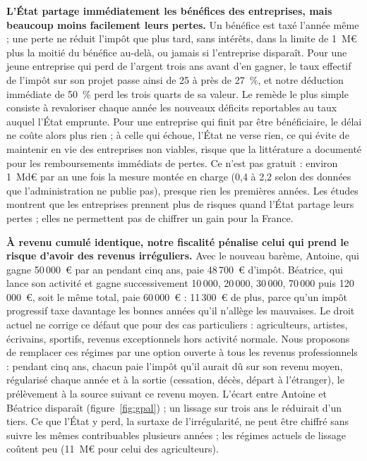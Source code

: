 \textbf{L'État partage immédiatement les bénéfices des entreprises, mais beaucoup moins facilement leurs pertes.} Un
bénéfice est taxé l'année même ; une perte ne réduit l'impôt que plus tard, sans intérêts, dans la limite de 1~M€ plus
la moitié du bénéfice au-delà, ou jamais si l'entreprise disparaît. Pour une jeune entreprise qui perd de l'argent trois
ans avant d'en gagner, le taux effectif de l'impôt sur son projet passe ainsi de 25 à près de 27~\%, et notre déduction
immédiate de 50~\% perd les trois quarts de sa valeur. Le remède le plus simple consiste à revaloriser chaque année les
nouveaux déficits reportables au taux auquel l'État emprunte. Pour une entreprise qui finit par être bénéficiaire, le
délai ne coûte alors plus rien ; à celle qui échoue, l'État ne verse rien, ce qui évite de maintenir en vie des
entreprises non viables, risque que la littérature a documenté pour les remboursements immédiats de pertes. Ce n'est
pas gratuit : environ 1~Md€ par an une fois la mesure montée en charge (0,4 à 2,2 selon des données que
l'administration ne publie pas), presque rien les premières années. Les études montrent que les entreprises prennent
plus de risques quand l'État partage leurs pertes ; elles ne permettent pas de chiffrer un gain pour la France.

\textbf{À revenu cumulé identique, notre fiscalité pénalise celui qui prend le risque d'avoir des revenus irréguliers.}
Avec le nouveau barème, Antoine, qui gagne 50\,000~€ par an pendant cinq ans, paie 48\,700~€ d'impôt. Béatrice, qui
lance son activité et gagne successivement 10\,000, 20\,000, 30\,000, 70\,000 puis 120\,000~€, soit le même total, paie
60\,000~€ : 11\,300~€ de plus, parce qu'un impôt progressif taxe davantage les bonnes années qu'il n'allège les
mauvaises. Le droit actuel ne corrige ce défaut que pour des cas particuliers : agriculteurs, artistes, écrivains,
sportifs, revenus exceptionnels hors activité normale. Nous proposons de remplacer ces régimes par une option ouverte à
tous les revenus professionnels : pendant cinq ans, chacun paie l'impôt qu'il aurait dû sur son revenu moyen,
régularisé chaque année et à la sortie (cessation, décès, départ à l'étranger), le prélèvement à la source suivant ce
revenu moyen. L'écart entre Antoine et Béatrice disparaît (figure~\ref{fig:gpal}) ; un lissage sur trois ans le réduirait
d'un tiers. Ce que l'État y perd, la surtaxe de l'irrégularité, ne peut être chiffré sans suivre les mêmes contribuables
plusieurs années ; les régimes actuels de lissage coûtent peu (11~M€ pour celui des agriculteurs).

